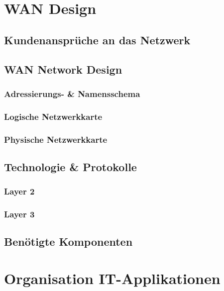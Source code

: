\section{WAN Design}

\subsection{Kundenansprüche an das Netzwerk}

\subsection{WAN Network Design}

\subsubsection{Adressierungs- \& Namensschema}

\subsubsection{Logische Netzwerkkarte}
\subsubsection{Physische Netzwerkkarte}

\subsection{Technologie \& Protokolle}
\subsubsection{Layer 2}
\subsubsection{Layer 3}

\subsection{Benötigte Komponenten}

\section{Organisation IT-Applikationen}


